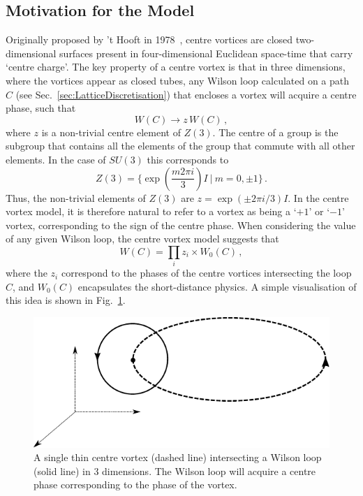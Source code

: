 \subsection{Motivation for the Model}\label{sec:Motivation}
Originally proposed by 't Hooft in 1978~\cite{'tHooft:1977hy,'tHooft:1979uj}, centre vortices are closed two-dimensional surfaces present in four-dimensional Euclidean space-time that carry `centre charge'. The key property of a centre vortex is that in three dimensions, where the vortices appear as closed tubes, any Wilson loop calculated on a path $C$ (see Sec.~\ref{sec:LatticeDiscretisation}) that encloses a vortex will acquire a centre phase, such that
%
\begin{equation}
W(C)\rightarrow z \,W(C)\, ,
\end{equation}
%
where $z$ is a non-trivial centre element of $Z(3)$. The centre of a group is the subgroup that contains all the elements of the group that commute with all other elements. In the case of $SU(3)$ this corresponds to
%
\begin{equation}
Z(3) = \big\lbrace \exp\left(\frac{m 2\pi i}{3} \right)I ~ | ~ m = 0,\pm 1\big\rbrace\, . 
\end{equation}
%
Thus, the non-trivial elements of $Z(3)$ are $z = \exp\left(\pm 2\pi i/3\right)I$. In the centre vortex model, it is therefore natural to refer to a vortex as being a `$+1$' or `$-1$' vortex, corresponding to the sign of the centre phase. When considering the value of any given Wilson loop, the centre vortex model suggests that
%
\begin{equation}
W(C) = \prod_i z_i\times W_0(C)\, ,
\end{equation}
%
where the $z_i$ correspond to the phases of the centre vortices intersecting the loop $C$, and $W_0(C)$ encapsulates the short-distance physics. A simple visualisation of this idea is shown in Fig.~\ref{fig:CentreVortex}.\\
% 
\begin{figure}
\centering
\includegraphics[width=0.9\linewidth]{./centre_vortex.pdf}
\caption[A single centre vortex intersecting a Wilson loop in 3 dimensions.]{\label{fig:CentreVortex} A single thin centre vortex (dashed line) intersecting a Wilson loop (solid line) in 3 dimensions. The Wilson loop will acquire a centre phase corresponding to the phase of the vortex.}
\end{figure}
%

